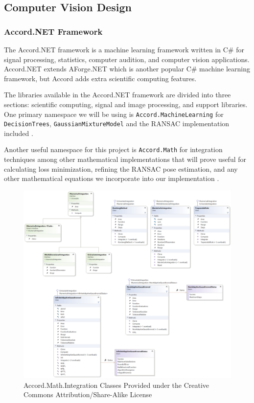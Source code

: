 \documentclass[12pt]{article}
\begin{document}
\subsection{Computer Vision Design}\label{computer-vision-design}

\subsubsection{Accord.NET Framework}\label{accord.net-framework}

The Accord.NET framework is a machine learning framework written in C\#
for signal processing, statistics, computer audition, and computer
vision applications. Accord.NET extends AForge.NET which is another
popular C\# machine learning framework, but Accord adds extra scientific
computing features.

The libraries available in the Accord.NET framework are divided into
three sections: scientific computing, signal and image processing, and
support libraries. One primary namespace we will be using is
\texttt{Accord.MachineLearning} for \texttt{DecisionTrees},
\texttt{GaussianMixtureModel} and the RANSAC implementation included
\autocite{accord}.

Another useful namespace for this project is \texttt{Accord.Math} for
integration techniques among other mathematical implementations that
will prove useful for calculating loss minimization, refining the RANSAC
pose estimation, and any other mathematical equations we incorporate
into our implementation \autocite{accord}.

\begin{figure}
\centering
\includegraphics{Pictures/Accord.Math.Integration.png}
\caption{Accord.Math.Integration Classes Provided under the Creative
Commons Attribution/Share-Alike License}
\end{figure}
\end{document}
